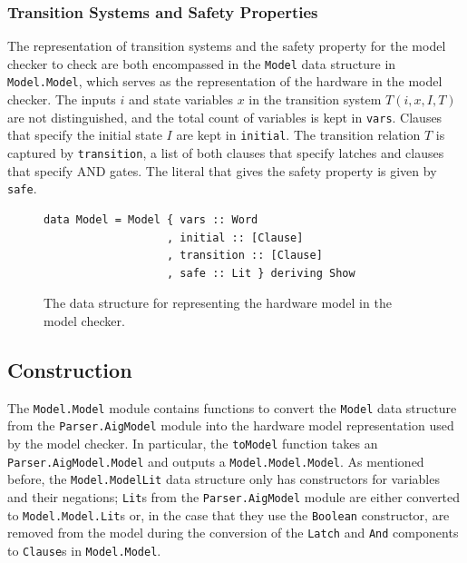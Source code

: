 \documentclass[12pt,a4paper,twoside,openright]{report}
\begin{document}
{\subsubsection{Transition Systems and Safety Properties}
The representation of transition systems and the safety property for the model checker to check
are both encompassed in the \verb,Model, data structure in \verb,Model.Model,, which serves
as the representation of the hardware in the model checker.
The inputs $i$ and state variables $x$ in the transition system $T(i,x,I,T)$
are not distinguished, and the total count of variables is kept in \verb,vars,.
Clauses that specify the initial state $I$ are kept in \verb,initial,.
The transition relation $T$ is captured by \verb,transition,, a list of both clauses that specify
latches and clauses that specify AND gates.
The literal that gives the safety property is given by \verb,safe,.

\begin{figure}[H]
\centering
\begin{verbatim}
data Model = Model { vars :: Word
                   , initial :: [Clause]
                   , transition :: [Clause]
                   , safe :: Lit } deriving Show
\end{verbatim}
\caption{The data structure for representing the hardware model in the model checker.}
\end{figure}

\subsection{Construction}

The \verb,Model.Model, module contains functions to convert the \verb,Model, data
structure from the \verb,Parser.AigModel, module into the hardware model representation used by
the model checker. In particular, the \verb,toModel, function takes an \verb,Parser.AigModel.Model,
and outputs a \verb,Model.Model.Model,. As mentioned before, the \verb,Model.ModelLit,
data structure only has constructors for variables and their negations; \verb,Lit,s from
the \verb,Parser.AigModel, module are either converted to \verb,Model.Model.Lit,s or, in the case
that they use the \verb,Boolean, constructor, are removed from the model during the conversion of
the \verb,Latch, and \verb,And, components to \verb,Clause,s in \verb,Model.Model,.

}
\end{document}
